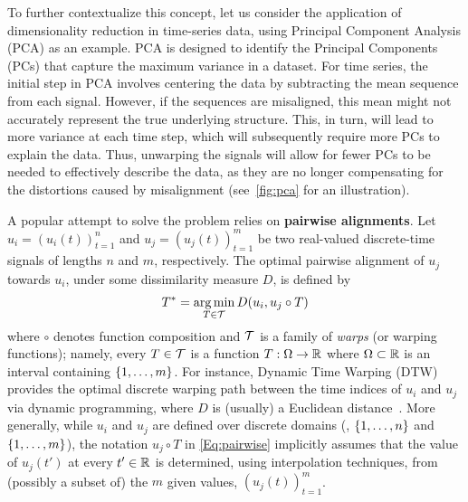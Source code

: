 To further contextualize this concept, let us consider the application of dimensionality reduction in time-series data, using Principal Component Analysis (PCA) as an example. PCA is designed to identify the Principal Components (PCs) that capture the maximum variance in a dataset. For time series, the initial step in PCA involves centering the data by subtracting the mean sequence from each signal. 
However, if the sequences are misaligned, this mean might not accurately represent the true underlying structure. This, in turn, will lead to 
more variance at each time step, which will subsequently require more PCs to explain the data. 
Thus, unwarping the signals will allow for fewer PCs to be needed to effectively describe the data, as they are no longer compensating for the distortions caused by misalignment (see~\autoref{fig:pca} for an illustration).


A popular attempt to solve the problem relies on \textbf{pairwise alignments}. 
 Let $u_i=(u_i(t))_{t=1}^n$ and $u_j=(u_j(t))_{t=1}^m$ be two real-valued discrete-time signals of lengths $n$ and $m$, respectively. 
 The optimal pairwise alignment of $u_j$ towards $u_i$, under some dissimilarity  measure $D$, is defined by 
 \begin{align}\label{Eq:pairwise}
     T^* = \operatorname*{arg\,min}_{T\in\mathcal{T}}D(u_i, u_j\circ T)
 \end{align}
 where $\circ$ denotes function composition and $\mathcal{T}$ is a family of \emph{warps} (or warping functions); namely, every $T\in\mathcal{T}$ 
 is a function  $T:\Omega \to \mathbb{R}$ where $\Omega\subset \mathbb{R} $ is an interval containing ${\{1,\ldots,m\}}$. 
 For instance, Dynamic Time Warping (DTW) provides the optimal discrete warping path between the time indices of $u_i$ and $u_j$ via dynamic programming, where $D$ is (usually) a Euclidean distance~\cite{Sakoe:ICA:1971:DTW1}.
 More generally, while $u_i$ and $u_j$ are defined over discrete domains (\ie, ${\{1,\ldots,n\}}$ and ${\{1,\ldots,m\}}$), 
 the notation $u_j\circ T$ in \autoref{Eq:pairwise} implicitly assumes that the value of  $u_j(t')$ at every $t'\in \mathbb{R}$
 is determined, using interpolation techniques, from (possibly a subset of) the $m$ given values, $(u_j(t))_{t=1}^m$. 

